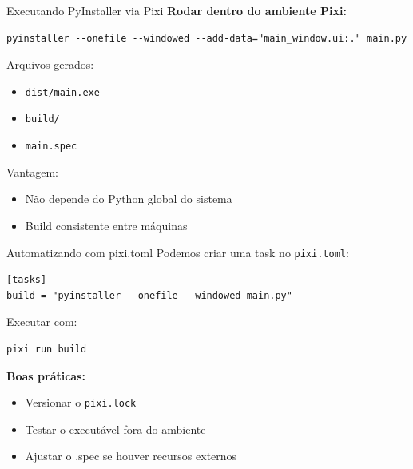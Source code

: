 \documentclass{beamer}
\begin{document}
\begin{frame}[fragile]{Executando PyInstaller via Pixi}
    \textbf{Rodar dentro do ambiente Pixi:}
    
    \begin{verbatim}
pyinstaller --onefile --windowed --add-data="main_window.ui:." main.py
    \end{verbatim}
     
    \vspace{0.4cm}
    
    Arquivos gerados:
    \begin{itemize}
        \item \texttt{dist/main.exe}
        \item \texttt{build/}
        \item \texttt{main.spec}
    \end{itemize}
    
    \vspace{0.4cm}
    
    Vantagem:
    \begin{itemize}
        \item Não depende do Python global do sistema
        \item Build consistente entre máquinas
    \end{itemize}
\end{frame}


\begin{frame}[fragile]{Automatizando com pixi.toml}
    Podemos criar uma task no \texttt{pixi.toml}:
    
    \begin{verbatim}
[tasks]
build = "pyinstaller --onefile --windowed main.py"
    \end{verbatim}
    
    \vspace{0.4cm}
    
    Executar com:
    \begin{verbatim}
pixi run build
    \end{verbatim}
    
    \vspace{0.5cm}
    
    \textbf{Boas práticas:}
    \begin{itemize}
        \item Versionar o \texttt{pixi.lock}
        \item Testar o executável fora do ambiente
        \item Ajustar o .spec se houver recursos externos
    \end{itemize}
\end{frame}
\end{document}
